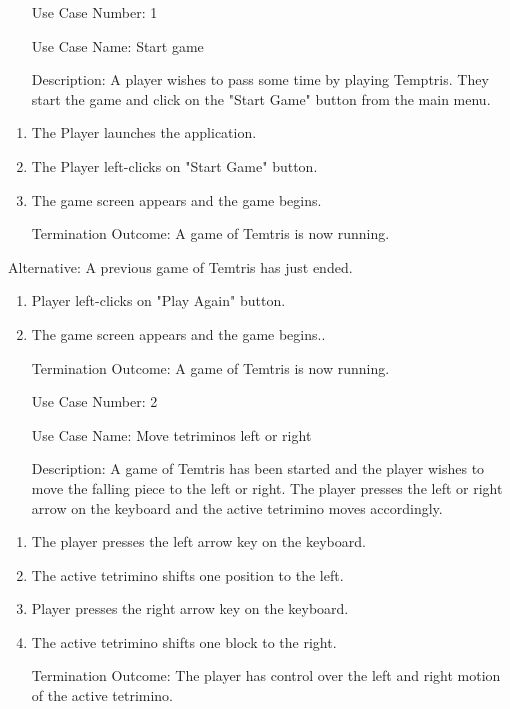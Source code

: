 \documentclass[10pt,conference,onecolumn,compsoc]{IEEEtran}
\begin{document}
\begin{itemize}
\item[Use Case Number:] 1
\item[Use Case Name:] Start game
\item[Description:] A player wishes to pass some time by playing Temptris. They start the game and click on the "Start Game" button from the main menu.
\end{itemize}
\begin{enumerate}
\item The Player launches the application.
\item The Player left-clicks on "Start Game" button.
\item The game screen appears and the game begins.
\item[Termination Outcome:] A game of Temtris is now running.
\end{enumerate}
Alternative: A previous game of Temtris has just ended.
\begin{enumerate}
\item Player left-clicks on "Play Again" button.
\item The game screen appears and the game begins..
\item[Termination Outcome:] A game of Temtris is now running.
\end{enumerate}
\medskip
 
\begin{itemize}
\item[Use Case Number:] 2
\item[Use Case Name:] Move tetriminos left or right
\item[Description:] A game of Temtris has been started and the player wishes to move the falling piece to the left or right. The player presses the left or right arrow on the keyboard and the active tetrimino moves accordingly.
\end{itemize}
\begin{enumerate}
\item The player presses the left arrow key on the keyboard.
\item The active tetrimino shifts one position to the left.
\item Player presses the right arrow key on the keyboard.
\item The active tetrimino shifts one block to the right.
\item[Termination Outcome:] The player has control over the left and right motion of the active tetrimino.
\end{enumerate}
\medskip
\end{document}
